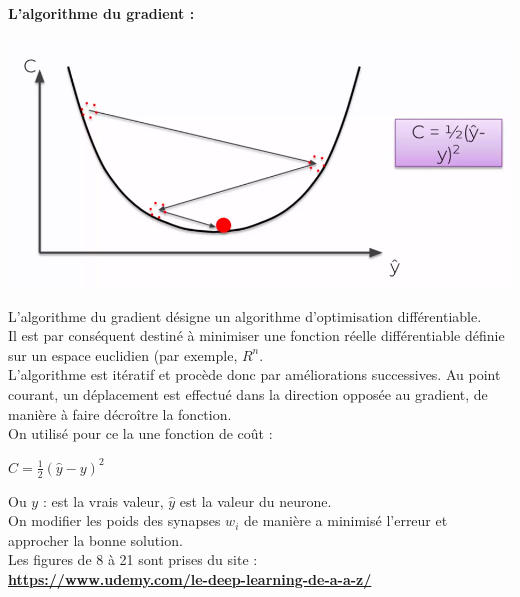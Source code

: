 \textbf{L’algorithme du gradient :}
\begin{center}
	\includegraphics[scale=0.2]{img24.png}
\end{center}
L'algorithme du gradient \cite{lecun1998gradient} désigne un algorithme d'optimisation différentiable.\\
Il est par conséquent destiné à minimiser une fonction réelle différentiable définie sur un espace euclidien (par exemple, ${R} ^{n}$.\\
L'algorithme est itératif et procède donc par améliorations successives. Au point courant, un déplacement est effectué dans la direction opposée au gradient, de manière à faire décroître la fonction.\\
On utilisé pour ce la une fonction de coût :
\begin{center}
	$C = \frac{1}{2} (\hat{y} - y)^{2}$
\end{center}
Ou $y$ : est la vrais valeur, $\hat{y}$ est la valeur du neurone.\\
On modifier les poids des synapses $w_{i}$ de manière a minimisé l'erreur et approcher la bonne solution.\\[1cm]

Les figures de 8 à 21 sont prises du site :\\
\textbf{\href{https://www.udemy.com/le-deep-learning-de-a-a-z/}{https://www.udemy.com/le-deep-learning-de-a-a-z/}}

\newpage
